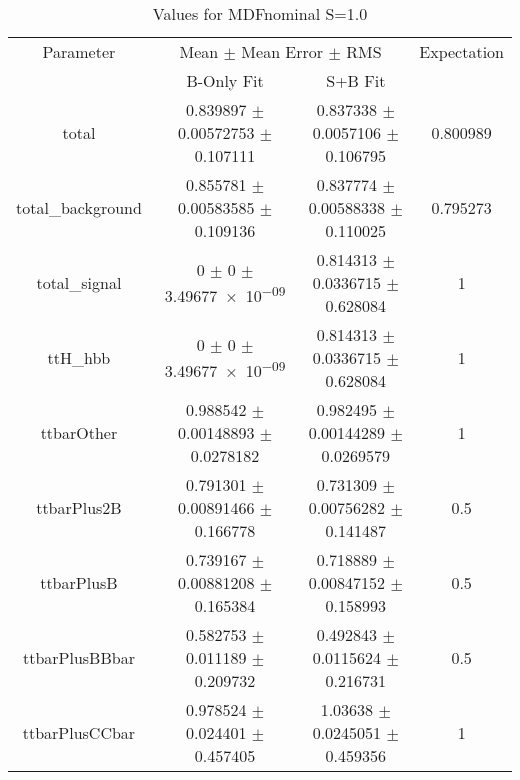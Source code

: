 \begin{table}
\centering
\caption{Values for MDFnominal S=1.0}
\begin{tabular}{cccc}
\toprule
Parameter & \multicolumn{2}{c}{Mean $\pm$ Mean Error $\pm$ RMS} & Expectation\\
 & B-Only Fit & S+B Fit & \\
\midrule
total & \num{0.839897} $\pm$ \num{0.00572753} $\pm$ \num{0.107111} & \num{0.837338} $\pm$ \num{0.0057106} $\pm$ \num{0.106795} & \num{0.800989}\\
total\_background & \num{0.855781} $\pm$ \num{0.00583585} $\pm$ \num{0.109136} & \num{0.837774} $\pm$ \num{0.00588338} $\pm$ \num{0.110025} & \num{0.795273}\\
total\_signal & \num{0} $\pm$ \num{0} $\pm$ \num{3.49677e-09} & \num{0.814313} $\pm$ \num{0.0336715} $\pm$ \num{0.628084} & \num{1}\\
ttH\_hbb & \num{0} $\pm$ \num{0} $\pm$ \num{3.49677e-09} & \num{0.814313} $\pm$ \num{0.0336715} $\pm$ \num{0.628084} & \num{1}\\
ttbarOther & \num{0.988542} $\pm$ \num{0.00148893} $\pm$ \num{0.0278182} & \num{0.982495} $\pm$ \num{0.00144289} $\pm$ \num{0.0269579} & \num{1}\\
ttbarPlus2B & \num{0.791301} $\pm$ \num{0.00891466} $\pm$ \num{0.166778} & \num{0.731309} $\pm$ \num{0.00756282} $\pm$ \num{0.141487} & \num{0.5}\\
ttbarPlusB & \num{0.739167} $\pm$ \num{0.00881208} $\pm$ \num{0.165384} & \num{0.718889} $\pm$ \num{0.00847152} $\pm$ \num{0.158993} & \num{0.5}\\
ttbarPlusBBbar & \num{0.582753} $\pm$ \num{0.011189} $\pm$ \num{0.209732} & \num{0.492843} $\pm$ \num{0.0115624} $\pm$ \num{0.216731} & \num{0.5}\\
ttbarPlusCCbar & \num{0.978524} $\pm$ \num{0.024401} $\pm$ \num{0.457405} & \num{1.03638} $\pm$ \num{0.0245051} $\pm$ \num{0.459356} & \num{1}\\
\bottomrule
\end{tabular}
\end{table}